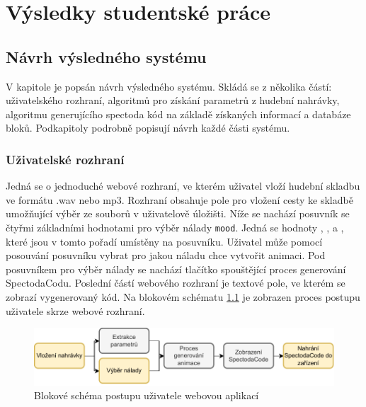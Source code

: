 \chapter{Výsledky studentské práce}



\section{Návrh výsledného systému}

V kapitole je popsán návrh výsledného systému. Skládá se z několika částí: uživatelského rozhraní, algoritmů pro získání parametrů z hudební nahrávky, algoritmu generujícího spectoda kód na základě získaných informací a databáze bloků. Podkapitoly podrobně popisují návrh každé části systému.

\subsection{Uživatelské rozhraní} \label{sec:User_interface}

Jedná se o jednoduché webové rozhraní, ve kterém uživatel vloží hudební skladbu ve formátu .wav nebo mp3. Rozhraní obsahuje pole pro vložení cesty ke skladbě umožňující výběr ze souborů v uživatelově úložišti. Níže se nachází posuvník se čtyřmi základními hodnotami pro výběr nálady
\texttt{mood}. Jedná se hodnoty , ,  a , které jsou v tomto pořadí umístěny na posuvníku. Uživatel může pomocí posouvání posuvníku vybrat pro jakou náladu chce vytvořit animaci. Pod posuvníkem pro výběr nálady se nachází tlačítko spouštějící proces generování SpectodaCodu.
Poslední částí webového rozhraní je textové pole, ve kterém se zobrazí vygenerovaný kód. Na blokovém schématu \ref{fig:User_interaction_diagram} je zobrazen proces postupu uživatele skrze webové rozhraní. 

 \begin{figure}[H]
    \centering
    \includegraphics[width = 1\linewidth]{obrazky/User_interaction_diagram.pdf}
    \caption{Blokové schéma postupu uživatele webovou aplikací}
    \label{fig:User_interaction_diagram}
\end{figure}

